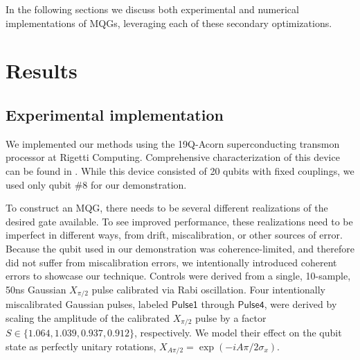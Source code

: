 \documentclass[aps,nofootinbib,pra,notitlepage,twocolumn]{revtex4-1}
\newcommand{\0}{\ensuremath{\mathbf{0}}}
\begin{document}
In the following sections we discuss both experimental and numerical implementations of MQGs, leveraging each of these secondary optimizations. 


\section{Results} %
\label{sec:results}


\subsection{Experimental implementation } %
\label{sub:experimental}
\noindent We implemented our methods using the 19Q-Acorn superconducting transmon processor at Rigetti Computing. Comprehensive characterization of this device can be found in \cite{1712.05771}. While this device consisted of 20 qubits with fixed couplings, we used only qubit \#8 for our demonstration.

To construct an MQG, there needs to be several different realizations of the desired gate available. To see improved performance, these realizations need to be imperfect in different ways, from drift, miscalibration, or other sources of error. Because the qubit used in our demonstration was coherence-limited, and therefore did not suffer from miscalibration errors, we intentionally introduced coherent errors to showcase our technique.  Controls were derived from a single, 10-sample, 50ns Gaussian $X_{\pi/2}$ pulse calibrated via Rabi oscillation. Four intentionally miscalibrated Gaussian pulses, labeled $\mathsf{Pulse1}$ through $\mathsf{Pulse4}$, were derived by scaling the amplitude of the calibrated $X_{\pi/2}$ pulse by a factor $S \in \{1.064, 1.039,0.937, 0.912\}$, respectively. We model their effect on the qubit state as perfectly unitary rotations, $X_{A \pi/2} = \exp{(-i A \pi/2 \sigma_x)}$.
\end{document}
